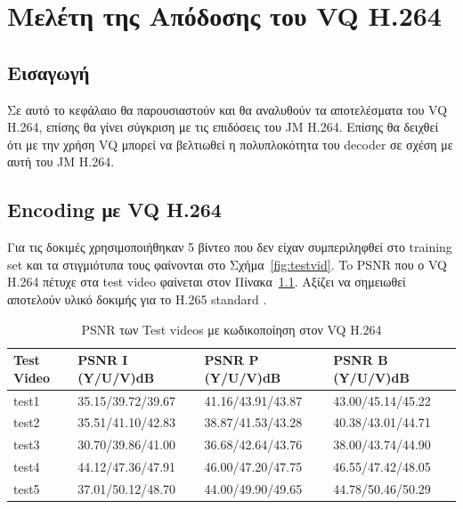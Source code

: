 ﻿\chapter{Μελέτη της Απόδοσης του VQ H.264}
\label{chapter:chap6}

\section{Εισαγωγή}
\label{section:sect61}

\indent Σε αυτό το κεφάλαιο θα παρουσιαστούν και θα αναλυθούν τα αποτελέσματα του VQ H.264, επίσης θα γίνει σύγκριση με τις επιδόσεις του JM H.264. Επίσης θα δειχθεί ότι με την χρήση VQ μπορεί να βελτιωθεί η πολυπλοκότητα του decoder σε σχέση με αυτή του JM H.264.

\section{Encoding με VQ H.264}
\label{section:sect62}

\indent Για τις δοκιμές χρησιμοποιήθηκαν 5 βίντεο που δεν είχαν συμπεριληφθεί στο training set και τα στιγμιότυπα τους φαίνονται στο Σχήμα~\ref{fig:testvid}. To PSNR που ο VQ H.264 πέτυχε στα test video φαίνεται στον Πίνακα~\ref{table:testpsnr}. Αξίζει να σημειωθεί αποτελούν υλικό δοκιμής για το H.265 standard \cite{misc:testvid}.

\begin{table}[h!]
    \begin{center}
        \begin{tabular}{| l | l | l | l |}
        \hline
        Test Video & PSNR I (Y/U/V)dB  & PSNR P (Y/U/V)dB  & PSNR B (Y/U/V)dB       \\ \hline
        test1      & 35.15/39.72/39.67 & 41.16/43.91/43.87 & 43.00/45.14/45.22      \\ \hline
        test2      & 35.51/41.10/42.83 & 38.87/41.53/43.28 & 40.38/43.01/44.71      \\ \hline
        test3      & 30.70/39.86/41.00 & 36.68/42.64/43.76 & 38.00/43.74/44.90      \\ \hline
        test4      & 44.12/47.36/47.91 & 46.00/47.20/47.75 & 46.55/47.42/48.05      \\ \hline
        test5      & 37.01/50.12/48.70 & 44.00/49.90/49.65 & 44.78/50.46/50.29      \\ \hline
        \hline
        \end{tabular}
    \end{center}

    \caption{PSNR των Test videos με κωδικοποίηση στον VQ H.264}
    \label{table:testpsnr}
\end{table}


